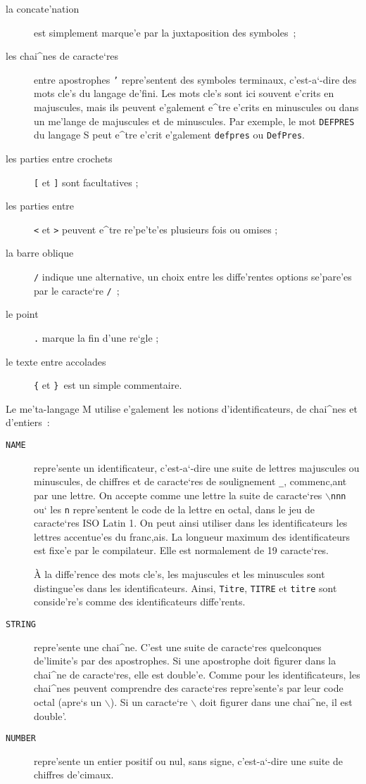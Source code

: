 \begin{description}
\item
[la concate'nation] est simplement marque'e par la juxtaposition des symboles~;
\item
[les chai^nes de caracte`res] entre apostrophes {\tt '} repre'sentent des
symboles terminaux, c'est-a`-dire des mots cle's du langage de'fini. Les
mots cle's sont ici souvent e'crits en majuscules, mais ils peuvent e'galement
e^tre e'crits en minuscules ou dans un me'lange de majuscules et de minuscules.
Par exemple, le mot {\tt DEFPRES} du langage S peut e^tre e'crit e'galement
{\tt defpres} ou {\tt DefPres}.
\item
[les parties entre crochets] {\tt [} et {\tt ]} sont facultatives ;
\item
[les parties entre] {\tt <} et {\tt >} peuvent e^tre re'pe'te'es plusieurs
fois ou omises ;
\item
[la barre oblique] {\tt /} indique une alternative, un choix entre les
diffe'rentes options se'pare'es par le caracte`re {\tt /}~;
\item
[le point] {\tt .} marque la fin d'une re`gle ;
\item
[le texte entre accolades] {\tt \{} et {\tt \} }est un simple commentaire.
\end{description}

Le me'ta-langage M utilise e'galement les notions d'identificateurs, de chai^nes
et d'entiers~:

\begin{description}
\item
[ {\tt NAME} ] repre'sente un identificateur, c'est-a`-dire une suite de
lettres majuscules ou minuscules, de chiffres et de caracte`res de soulignement
{\tt \_}, commenc,ant par une lettre. On accepte comme une lettre la suite de
caracte`res {\tt $\backslash$nnn} ou` les {\tt n} repre'sentent le code de la
lettre en octal, dans le jeu de caracte`res ISO Latin 1. On peut ainsi utiliser
dans les identificateurs les lettres accentue'es du franc,ais. La longueur
maximum des identificateurs est fixe'e par le compilateur. Elle est
normalement de 19 caracte`res.

\`{A} la diffe'rence des mots cle's, les majuscules et les minuscules sont
distingue'es dans les identificateurs. Ainsi, {\tt Titre}, {\tt TITRE} et
{\tt titre} sont conside're's comme des identificateurs diffe'rents.

\item
[ {\tt STRING} ] repre'sente une chai^ne. C'est une suite de caracte`res
quelconques de'limite's par des apostrophes. Si une apostrophe doit figurer
dans la chai^ne de caracte`res, elle est double'e. Comme pour les
identificateurs, les chai^nes peuvent comprendre des caracte`res repre'sente's
par leur code octal (apre`s un $\backslash$). Si un caracte`re $\backslash$
doit figurer dans une chai^ne, il est double'.

\item
[ {\tt NUMBER} ] repre'sente un entier positif ou nul, sans signe,
c'est-a`-dire une suite de chiffres de'cimaux.
\end{description}

